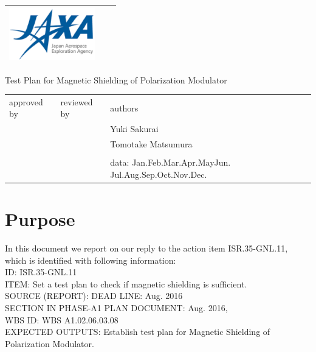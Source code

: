 \documentclass[11pt]{article}
\newcommand{\fulltoday}{\ifcase\month\or
    Jan.\or Feb.\or Mar.\or Apr.\or May\or Jun.\or
    Jul.\or Aug.\or Sep.\or Oct.\or Nov.\or Dec.\fi
    \space\number\day\
    \space\number\year}
\begin{document}
\begin{tabular}{ |P|P|P| } \hline
\includegraphics[height=23mm]{figs/images.eps} & &   \rule[0mm]{0mm}{25mm} \\ \hline
\end{tabular}


\vspace*{60mm}
\begin{center}
  \LARGE
  Test Plan for Magnetic Shielding of Polarization Modulator \\
\end{center}
\vspace*{100mm}


\begin{tabular}{ |p{50mm}|p{50mm}|p{50mm}| } \hline
approved by & reviewed by  & authors            \\
            &             & Yuki Sakurai       \\
            &             & Tomotake Matsumura \\
            &             &                    \\
            &             & data: \fulltoday   \\
\hline
\end{tabular}

\clearpage

\section*{Purpose}
In this document we report on our reply to the action item ISR.35-GNL.11, which is identified with following information: \\
ID: ISR.35-GNL.11 \\
ITEM: Set a test plan to check if magnetic shielding is sufficient. \\
SOURCE (REPORT): %
DEAD LINE: Aug. 2016 \\
SECTION IN PHASE-A1 PLAN DOCUMENT: Aug. 2016, \\ %
WBS ID: WBS A1.02.06.03.08 \\ %
EXPECTED OUTPUTS: Establish test plan for Magnetic Shielding of Polarization Modulator. \\
\end{document}
